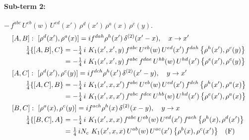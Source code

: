 \documentclass[10pt]{article}
\numberwithin{equation}{section}
\begin{document}
\paragraph{Sub-term 2:} $-\,f^{abc}\,U^{eb}(w)\,U^{ed}(x')\,\rho^{d}(x')\,\rho^{a}(x)\,\rho^{c}(y)$.
\begin{align}
&[A,B]:\ [\rho^{d}(x'),\rho^{a}(x)]=i f^{dah}\rho^{h}(x')\,\delta^{(2)}(x'-x),\quad x\to x'\notag\\
&\qquad \tfrac14\{[A,B],C\}=-\tfrac14\,i\,\,K_1(x',x',y)\,f^{abc}\,U^{eb}(w)\,U^{ed}(x')\,f^{dah}\,\big\{\rho^{h}(x'),\rho^{c}(y)\big\}\notag\\
&\qquad\phantom{\tfrac14\{[A,B],C\}}=-\tfrac14\,i\,\,K_1(x',x',y)\,f^{abc}\,f^{dae}\,U^{hb}(w)\,U^{hd}(x')\,\big\{\rho^{e}(x'),\rho^{c}(y)\big\}
\label{eq:A1-2-AB}\\
&[A,C]:\ [\rho^{d}(x'),\rho^{c}(y)]=i f^{dch}\rho^{h}(x')\,\delta^{(2)}(x'-y),\quad y\to x'\notag\\
&\qquad \tfrac14\{[A,C],B\}=-\tfrac14\,i\,\,K_1(x',x,x')\,f^{abc}\,U^{eb}(w)\,U^{ed}(x')\,f^{dch}\,\big\{\rho^{h}(x'),\rho^{a}(x)\big\}\notag\\
&\qquad\phantom{\tfrac14\{[A,C],B\}}=-\tfrac14\,i\,\,K_1(x',x,x')\,f^{abc}\,f^{dce}\,U^{hb}(w)\,U^{hd}(x')\,\big\{\rho^{e}(x'),\rho^{a}(x)\big\}
\label{eq:A1-2-AC}\\
&[B,C]:\ [\rho^{a}(x),\rho^{c}(y)]=i f^{ach}\rho^{h}(x)\,\delta^{(2)}(x-y),\quad y\to x\notag\\
&\qquad \tfrac14\{[B,C],A\}=-\tfrac14\,i\,\,K_1(x',x,x)\,f^{abc}\,U^{eb}(w)\,U^{ed}(x')\,f^{ach}\,\big\{\rho^{h}(x),\rho^{d}(x')\big\}\notag\\
&\qquad\phantom{\tfrac14\{[B,C],A\}}=\tfrac14\,i N_{c}\,\,K_1(x',x,x)\,U^{ab}(w)\,U^{ac}(x')\,\big\{\rho^{b}(x),\rho^{c}(x')\big\}\quad\text{(F)}
\label{eq:A1-2-BC}
\end{align}
\end{document}
